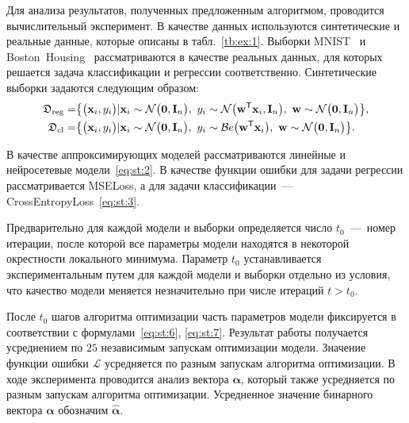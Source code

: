 Для анализа результатов, полученных предложенным алгоритмом, проводится вычислительный эксперимент. В качестве данных используются синтетические и реальные данные, которые описаны в табл.~\ref{tb:ex:1}. Выборки MNIST~\cite{mnist} и Boston~Housing~\cite{Boston} рассматриваются в качестве реальных данных, для которых решается задача классификации и регрессии соответственно. Синтетические выборки задаются следующим образом:
\[
\label{eq:ex:1}
\begin{aligned}
\mathfrak{D}_{\text{\text{reg}}} &= \bigr\{\bigr(\textbf{x}_i, y_i \bigr) |\textbf{x}_{i}\sim\mathcal{N}\bigr(\textbf{0}, \textbf{I}_{n}\bigr),~y_{i}\sim\mathcal{N}\bigr(\textbf{w}^{\mathsf{T}}\textbf{x}_{i}, \textbf{I}_{n}\bigr),~ \textbf{w} \sim \mathcal{N}\bigr(\textbf{0}, \textbf{I}_{n}\bigr)\bigr\},\\
\mathfrak{D}_{\text{\text{cl}}} &= \bigr\{\bigr(\textbf{x}_i, y_i \bigr) |\textbf{x}_{i}\sim\mathcal{N}\bigr(\textbf{0}, \textbf{I}_{n}\bigr),~y_{i}\sim\mathcal{B}e\bigr(\textbf{w}^{\mathsf{T}}\textbf{x}_{i}\bigr),~ \textbf{w} \sim \mathcal{N}\bigr(\textbf{0}, \textbf{I}_{n}\bigr)\bigr\}.
\end{aligned}
\]

В качестве аппроксимирующих моделей рассматриваются линейные и нейросетевые модели~\eqref{eq:st:2}. В качестве функции ошибки для задачи регрессии рассматривается MSELoss, а для задачи классификации~--- CrossEntropyLoss~\eqref{eq:st:3}.

Предварительно для каждой модели и выборки определяется число $t_0$~---~номер итерации, после которой все параметры модели находятся в некоторой окрестности локального минимума. Параметр $t_0$ устанавливается экспериментальным путем для каждой модели и выборки отдельно из условия, что качество модели меняется незначительно при числе итераций $t>t_0$.

После $t_0$ шагов алгоритма оптимизации часть параметров модели фиксируется в соответствии с формулами~\eqref{eq:st:6}, \eqref{eq:st:7}. Результат работы получается усреднением по $25$ независимым запускам оптимизации модели. Значение функции ошибки $\mathcal{L}$ усредняется по разным запускам алгоритма оптимизации. В ходе эксперимента проводится анализ вектора $\bm{\alpha}$, который также усредняется по разным запускам алгоритма оптимизации. Усредненное значение бинарного вектора  $\bm{\alpha}$ обозначим $\hat{\bm{\alpha}}$.



